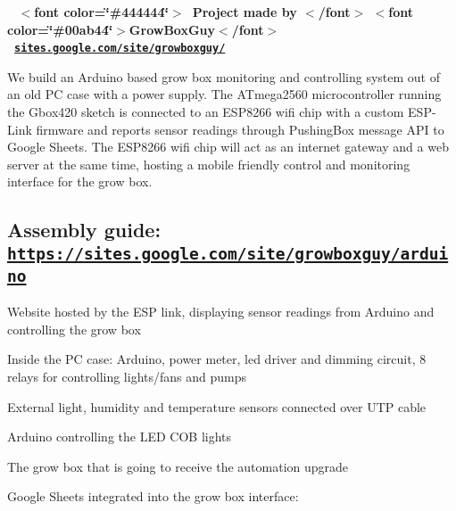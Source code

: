   \href{https://www.patreon.com/growboxguy}{\tt } \href{https://www.facebook.com/Gbox420-1495966037151416/}{\tt } \href{https://github.com/growboxguy/Gbox420}{\tt } \href{https://www.tumblr.com/blog/growboxguy}{\tt } \href{https://twitter.com/growboxguy}{\tt } \href{mailto:GrowBoxGuy@gmail.com}{\tt } ~\newline
  {\bfseries  $<$font color=\char`\"{}\#444444\char`\"{}$>$~Project made by $<$/font$>$ $<$font color=\char`\"{}\#00ab44\char`\"{}$>$Grow\+Box\+Guy$<$/font$>$~\newline
 ~\href{http://sites.google.com/site/growboxguy/}{\tt sites.\+google.\+com/site/growboxguy/} } ~\newline


 We build an Arduino based grow box monitoring and controlling system out of an old PC case with a power supply. The A\+Tmega2560 microcontroller running the Gbox420 sketch is connected to an E\+S\+P8266 wifi chip with a custom E\+S\+P-\/\+Link firmware and reports sensor readings through Pushing\+Box message A\+PI to Google Sheets. The E\+S\+P8266 wifi chip will act as an internet gateway and a web server at the same time, hosting a mobile friendly control and monitoring interface for the grow box. 

\subsection*{Assembly guide\+: \href{https://sites.google.com/site/growboxguy/arduino}{\tt https\+://sites.\+google.\+com/site/growboxguy/arduino}}

 



Website hosted by the E\+SP link, displaying sensor readings from Arduino and controlling the grow box 

Inside the PC case\+: Arduino, power meter, led driver and dimming circuit, 8 relays for controlling lights/fans and pumps 

External light, humidity and temperature sensors connected over U\+TP cable 

Arduino controlling the L\+ED C\+OB lights 

The grow box that is going to receive the automation upgrade 

Google Sheets integrated into the grow box interface\+: 

 